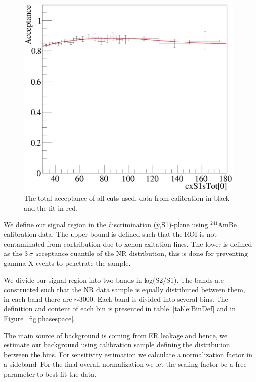 \begin{figure}[h!]
\begin{minipage}{1.\linewidth}
\centerline{\includegraphics[width=1.\linewidth]{Figures/Acceptance.eps}}
\end{minipage}
\caption{The total acceptance of all cuts used, data from calibration in black and the fit in red.}
\label{fig:Acc}
\end{figure}

We define our signal region in the discrimination (y,S1)-plane using $^{241}$AmBe calibration data. The upper bound is defined such that the ROI is not contaminated from contribution due to xenon exitation lines.
The lower is defined as the 3\,$\sigma$ acceptance quantile of the NR distribution, this is done for preventing gamma-X events to penetrate the sample.

We divide our signal region into two bands in log(S2/S1). The bands are constructed such that the NR data sample is equally distributed between them, in each band there are $\sim3000$. Each band is divided into several bins. The definition and content of each bin is presented in table~\ref{table:BinDef} and in Figure~\ref{fig:phasespace}. 



The main source of background is coming from ER leakage and hence, we estimate our background using calibration sample defining the distribution between the bins. 
For sensitivity estimation we calculate a normalization factor in a sideband. For the final overall normalization we let the scaling factor be a free parameter to best fit the data.


